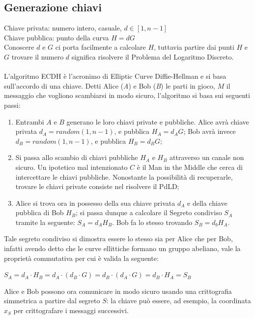 \documentclass[a4paper,12pt]{tesiinfo}
\begin{document}
\subsection{Generazione chiavi}
Chiave privata: numero intero, casuale, $d \in [1, n-1]$\\
Chiave pubblica: punto della curva $H = dG$\\
Conoscere $d$ e $G$ ci porta facilmente a calcolare $H$, tuttavia partire dai punti $H$ e $G$ trovare il numero $d$ significa risolvere il Problema del Logaritmo Discreto.
\\
\\
L'algoritmo ECDH \`e l'acronimo di Elliptic Curve Diffie-Hellman e si basa sull'accordo di una chiave. Detti Alice (\textit{A}) e Bob (\textit{B}) le parti in gioco, $M$ il messaggio che vogliono scambiarsi in modo sicuro, l'algoritmo si basa sui seguenti passi:
\begin{enumerate}
 \item Entrambi $A$ e $B$ generano le loro chiavi private e pubbliche. Alice avr\`a chiave privata $d_A = random(1, n-1)$, e pubblica $H_A = d_AG$; Bob avr\`a invece $d_B = random(1, n-1)$, e pubblica $H_B = d_BG$;
 
 \item Si passa allo scambio di chiavi pubbliche $H_A$ e $H_B$ attraverso un canale non sicuro. Un ipotetico mal intenzionato $C$ \`e il Man in the Middle che cerca di intercettare le chiavi pubbliche. Nonostante la possibilit\`a di recuperarle, trovare le chiavi private consiste nel risolvere il PdLD;
 
 \item Alice si trova ora in possesso della sua chiave privata $d_A$ e della chiave pubblica di Bob $H_B$; si passa dunque a calcolare il Segreto condiviso $S_A$ tramite la seguente: $S_A = d_AH_B$. Bob fa lo stesso trovando $S_B = d_bH_A$.
\end{enumerate}
Tale segreto condiviso si dimostra essere lo stesso sia per Alice che per Bob, infatti avendo detto che le curve ellittiche formano un gruppo abeliano, vale la propriet\`a commutativa per cui \`e valida la seguente:
\begin{center}
 $S_A = d_A \cdot H_B = d_A \cdot (d_B \cdot G) = d_B \cdot (d_A \cdot G) = d_B \cdot H_A = S_B$
\end{center}
Alice e Bob possono ora comunicare in modo sicuro usando una crittografia simmetrica a partire dal segreto $S$: la chiave pu\`o essere, ad esempio, la coordinata $x_S$ per crittografare i messaggi successivi.
\end{document}

